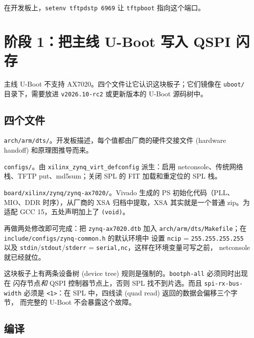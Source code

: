 \documentclass[11pt,a4paper,oneside]{article}
\newcommand{\file}[1]{{\color{bluemid}\nolinkurl{#1}}}
\newcommand{\cmd}[1]{\texttt{#1}}
\newcommand{\repo}{https://github.com/MaxClerkwell/ax7020-bringup}
\newcommand{\rfile}[1]{\href{\repo/blob/master/#1}{\color{bluemid}\nolinkurl{#1}}}
\begin{document}
在开发板上，\cmd{setenv tftpdstp 6969} 让 \cmd{tftpboot} 指向这个端口。

\section{阶段 1：把主线 U-Boot 写入 QSPI 闪存}

主线 U-Boot 不支持 AX7020。四个文件让它认识这块板子；它们镜像在
\file{uboot/} 目录下，需要放进 \cmd{v2026.10-rc2} 或更新版本的 U-Boot 源码树中。

\subsection{四个文件}

\begin{filelist}
  \item[\rfile{uboot/zynq-ax7020.dts}] \file{arch/arm/dts/}。开发板描述，每个值都由厂商的硬件交接文件 (hardware handoff) 和原理图推导而来。
  \item[\rfile{uboot/alinx_ax7020_defconfig}] \file{configs/}。由 \cmd{xilinx\_zynq\_virt\_defconfig} 派生：启用 netconsole、传统网络栈、TFTP put、md5sum；关闭 SPL 的 FIT 加载和重定位的 SPL 栈。
  \item[\rfile{uboot/ps7_init_gpl.c}, \file{.h}] \file{board/xilinx/zynq/zynq-ax7020/}。Vivado 生成的 PS 初始化代码（PLL、MIO、DDR 时序），从厂商的 XSA 归档中提取，XSA 其实就是一个普通 zip。为适配 GCC 15，五处声明加上了 \cmd{(void)}。
\end{filelist}

再做两处修改即可完成：把 \cmd{zynq-ax7020.dtb} 加入
\file{arch/arm/dts/Makefile}；在 \file{include/configs/zynq-common.h} 的默认环境中
设置 \cmd{ncip} = \cmd{255.255.255.255} 以及
\cmd{stdin}/\cmd{stdout}/\cmd{stderr} = \cmd{serial,nc}，这样在环境变量可写之前，
netconsole 就已经就位。

\begin{mustknow}
这块板子上有两条设备树 (device tree) 规则是强制的。\cmd{bootph-all} 必须同时出现在
闪存节点\emph{和} QSPI 控制器节点上，否则 SPL 找不到片选。而且 \cmd{spi-rx-bus-width}
必须是 \cmd{<1>}：在 SPL 中，四线读 (quad read) 返回的数据会偏移三个字节，
而完整的 U-Boot 不会暴露这个故障。
\end{mustknow}

\subsection{编译}
\end{document}
